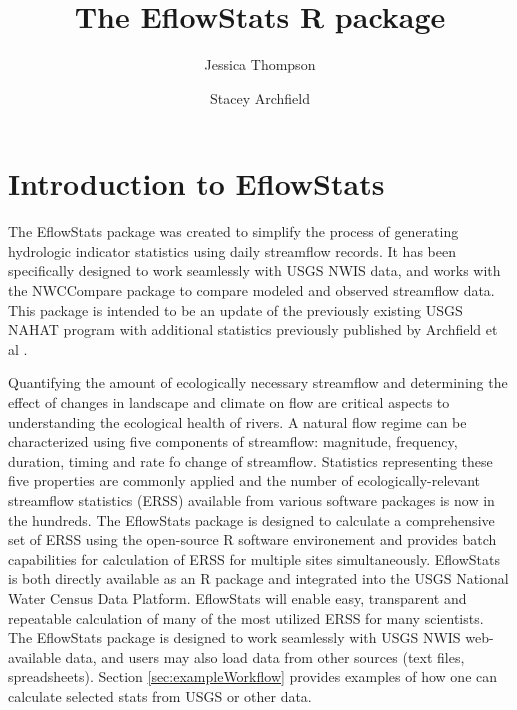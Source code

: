 \documentclass[a4paper,11pt]{article}\usepackage[]{graphicx}\usepackage[]{color}
\begin{document}
\title{The EflowStats R package}
\author[1]{Jessica Thompson}
\author[1]{Stacey Archfield}





\maketitle
\tableofcontents

\section{Introduction to EflowStats}
                
The EflowStats package was created to simplify the process of generating hydrologic indicator statistics using daily streamflow records. It has been specifically designed to work seamlessly with USGS NWIS data, and works with the NWCCompare package to compare modeled and observed streamflow data. This package is intended to be an update of the previously existing USGS NAHAT program \cite{NAHAT} with additional statistics previously published by Archfield et al \cite{Archfield}.     
              
Quantifying the amount of ecologically necessary streamflow and determining the effect of changes in landscape and climate on flow are critical aspects to understanding the ecological health of rivers. A natural flow regime can be characterized using five components of streamflow: magnitude, frequency, duration, timing and rate fo change of streamflow. Statistics representing these five properties are commonly applied and the number of ecologically-relevant streamflow statistics (ERSS) available from various software packages is now in the hundreds. The EflowStats package is designed to calculate a comprehensive set of ERSS using the open-source R software environement and provides batch capabilities for calculation of ERSS for multiple sites simultaneously. EflowStats is both directly available as an R package and integrated into the USGS National Water Census Data Platform. EflowStats will enable easy, transparent and repeatable calculation of many of the most utilized ERSS for many scientists. The EflowStats package is designed to work seamlessly with USGS NWIS web-available data, and users may also load data from other sources (text files, spreadsheets).  Section \ref{sec:exampleWorkflow} provides examples of how one can calculate selected stats from USGS or other data. 
              
\end{document}
